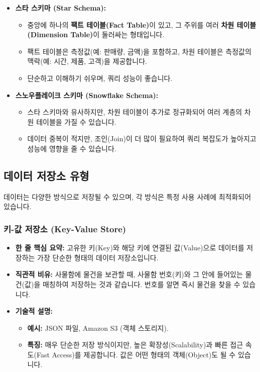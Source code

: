 \documentclass[11pt,a4paper]{article}
\begin{document}
\begin{itemize}
    \item \textbf{스타 스키마 (Star Schema):}
    \begin{itemize}
        \item 중앙에 하나의 \textbf{팩트 테이블(Fact Table)}이 있고, 그 주위를 여러 \textbf{차원 테이블(Dimension Table)}이 둘러싸는 형태입니다.
        \item 팩트 테이블은 측정값(예: 판매량, 금액)을 포함하고, 차원 테이블은 측정값의 맥락(예: 시간, 제품, 고객)을 제공합니다.
        \item 단순하고 이해하기 쉬우며, 쿼리 성능이 좋습니다.
    \end{itemize}
    \item \textbf{스노우플레이크 스키마 (Snowflake Schema):}
    \begin{itemize}
        \item 스타 스키마와 유사하지만, 차원 테이블이 추가로 정규화되어 여러 계층의 차원 테이블을 가질 수 있습니다.
        \item 데이터 중복이 적지만, 조인(Join)이 더 많이 필요하여 쿼리 복잡도가 높아지고 성능에 영향을 줄 수 있습니다.
    \end{itemize}
\end{itemize}

\subsection{데이터 저장소 유형}

데이터는 다양한 방식으로 저장될 수 있으며, 각 방식은 특정 사용 사례에 최적화되어 있습니다.

\subsubsection{키-값 저장소 (Key-Value Store)}
\begin{itemize}
    \item \textbf{한 줄 핵심 요약:} 고유한 키(Key)와 해당 키에 연결된 값(Value)으로 데이터를 저장하는 가장 단순한 형태의 데이터 저장소입니다.
    \item \textbf{직관적 비유:} 사물함에 물건을 보관할 때, 사물함 번호(키)와 그 안에 들어있는 물건(값)을 매칭하여 저장하는 것과 같습니다. 번호를 알면 즉시 물건을 찾을 수 있습니다.
    \item \textbf{기술적 설명:}
    \begin{itemize}
        \item \textbf{예시:} JSON 파일, Amazon S3 (객체 스토리지).
        \item \textbf{특징:} 매우 단순한 저장 방식이지만, 높은 확장성(Scalability)과 빠른 접근 속도(Fast Access)를 제공합니다. 값은 어떤 형태의 객체(Object)도 될 수 있습니다.
    \end{itemize}
\end{itemize}
\end{document}

